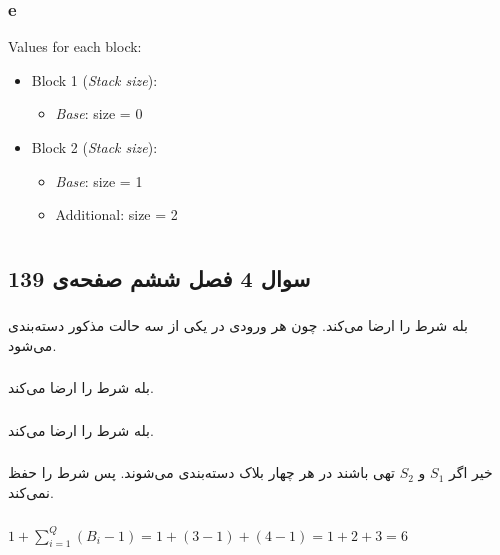 \documentclass{article}
\begin{document}
\begin{latin}
\subsubsection{e}
Values for each block:
\begin{itemize}
    \item Block 1 (\textit{Stack size}):
    \begin{itemize}
        \item \textit{Base}: size = 0
    \end{itemize}
    
    \item Block 2 (\textit{Stack size}):
    \begin{itemize}
        \item \textit{Base}: size = 1
        \item Additional: size = 2
    \end{itemize}
\end{itemize}

\end{latin}



\section{}%
\subsection{سوال 4 فصل ششم صفحه‌ی 139}
\subsubsection{}
بله شرط  را ارضا می‌کند. چون هر ورودی در یکی از سه حالت مذکور دسته‌بندی می‌شود.
\subsubsection{}
بله شرط  را ارضا می‌کند.
\subsubsection{}
بله شرط  را ارضا می‌کند.
\subsubsection{}
خیر اگر $S_1$ و $S_2$ تهی باشند در هر چهار بلاک دسته‌بندی می‌شوند. پس شرط  را حفظ نمی‌کند.
\subsubsection{}
\begin{latin}
$1 + \sum_{i = 1}^{Q} \left( B_i - 1 \right) = 1 + (3 - 1) + (4 - 1) = 1 + 2 + 3 = 6$
\end{latin}
\end{document}
